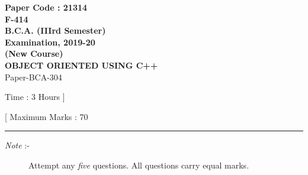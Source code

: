 \documentclass[12pt]{article}
\begin{document}
\pagestyle{empty}

\begin{center}

	\textsf{
		\textbf{
			\LARGE Paper Code : 21314\\
			\normalsize F-414\\
			B.C.A. (IIIrd Semester)\\
			Examination, 2019-20\\
			(New Course)\\
			\small{OBJECT ORIENTED USING C++\\}
		}
		Paper-BCA-304
	}

	\begin{minipage}{0.49\linewidth}
		\raggedright\footnotesize Time : 3 Hours ]
	\end{minipage}
	\begin{minipage}{0.49\linewidth}
		\raggedleft\footnotesize [ Maximum Marks : 70
	\end{minipage}

\end{center}

\rule{0.9\linewidth}{0.1mm}

\begin{description}
	\item[\textit{Note }:-] Attempt any \textit{five} questions. All questions carry equal marks.
\end{description}
\end{document}
